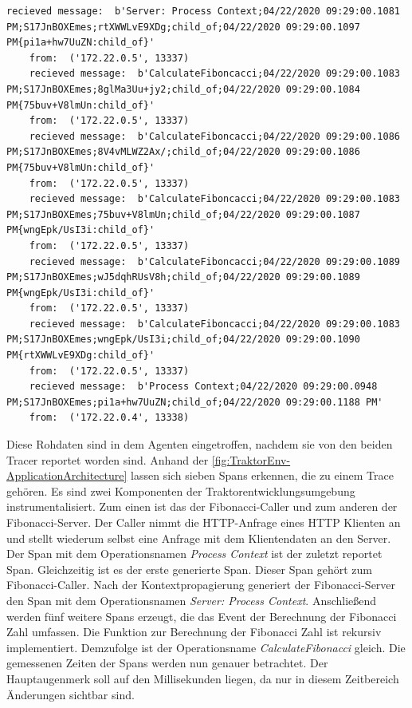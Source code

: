 \begin{minipage}[]{\textwidth}
	\begin{lstlisting}[frame=trBL]
	recieved message:  b'Server: Process Context;04/22/2020 09:29:00.1081 PM;S17JnBOXEmes;rtXWWLvE9XDg;child_of;04/22/2020 09:29:00.1097 PM{pi1a+hw7UuZN:child_of}'
	from:  ('172.22.0.5', 13337)
	recieved message:  b'CalculateFiboncacci;04/22/2020 09:29:00.1083 PM;S17JnBOXEmes;8glMa3Uu+jy2;child_of;04/22/2020 09:29:00.1084 PM{75buv+V8lmUn:child_of}'
	from:  ('172.22.0.5', 13337)
	recieved message:  b'CalculateFiboncacci;04/22/2020 09:29:00.1086 PM;S17JnBOXEmes;8V4vMLWZ2Ax/;child_of;04/22/2020 09:29:00.1086 PM{75buv+V8lmUn:child_of}'
	from:  ('172.22.0.5', 13337)
	recieved message:  b'CalculateFiboncacci;04/22/2020 09:29:00.1083 PM;S17JnBOXEmes;75buv+V8lmUn;child_of;04/22/2020 09:29:00.1087 PM{wngEpk/UsI3i:child_of}'
	from:  ('172.22.0.5', 13337)
	recieved message:  b'CalculateFiboncacci;04/22/2020 09:29:00.1089 PM;S17JnBOXEmes;wJ5dqhRUsV8h;child_of;04/22/2020 09:29:00.1089 PM{wngEpk/UsI3i:child_of}'
	from:  ('172.22.0.5', 13337)
	recieved message:  b'CalculateFiboncacci;04/22/2020 09:29:00.1083 PM;S17JnBOXEmes;wngEpk/UsI3i;child_of;04/22/2020 09:29:00.1090 PM{rtXWWLvE9XDg:child_of}'
	from:  ('172.22.0.5', 13337)
	recieved message:  b'Process Context;04/22/2020 09:29:00.0948 PM;S17JnBOXEmes;pi1a+hw7UuZN;child_of;04/22/2020 09:29:00.1188 PM'
	from:  ('172.22.0.4', 13338)
	\end{lstlisting}
	\label{listing:Tracerrohdaten aus der Traktorentwicklungsumgebung}
\end{minipage}

Diese Rohdaten sind in dem Agenten eingetroffen, nachdem sie von den beiden Tracer reportet worden sind. Anhand der \cref{fig:TraktorEnv-ApplicationArchitecture} lassen sich sieben Spans erkennen, die zu einem Trace gehören. Es sind zwei Komponenten der Traktorentwicklungsumgebung instrumentalisiert. Zum einen ist das der Fibonacci-Caller und zum anderen der Fibonacci-Server. Der Caller nimmt die HTTP-Anfrage eines HTTP Klienten an und stellt wiederum selbst eine Anfrage mit dem Klientendaten an den Server. Der Span mit dem Operationsnamen \emph{Process Context} ist der zuletzt reportet Span. Gleichzeitig ist es der erste generierte Span. Dieser Span gehört zum Fibonacci-Caller. Nach der Kontextpropagierung generiert der Fibonacci-Server den Span mit dem Operationsnamen \emph{Server: Process Context}. Anschließend werden fünf weitere Spans erzeugt, die das Event der Berechnung der Fibonacci Zahl umfassen. Die Funktion zur Berechnung der Fibonacci Zahl ist rekursiv implementiert. Demzufolge ist der Operationsname \emph{CalculateFibonacci} gleich. Die gemessenen Zeiten der Spans werden nun genauer betrachtet. Der Hauptaugenmerk soll auf den Millisekunden liegen, da nur in diesem Zeitbereich Änderungen sichtbar sind.


